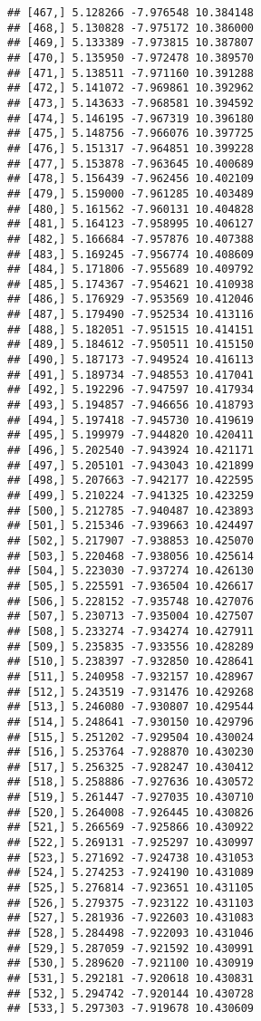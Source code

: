 \documentclass[]{book}
\theoremstyle{definition}
\theoremstyle{definition}
\theoremstyle{definition}
\theoremstyle{remark}
\begin{document}
\begin{verbatim}
## [467,] 5.128266 -7.976548 10.384148
## [468,] 5.130828 -7.975172 10.386000
## [469,] 5.133389 -7.973815 10.387807
## [470,] 5.135950 -7.972478 10.389570
## [471,] 5.138511 -7.971160 10.391288
## [472,] 5.141072 -7.969861 10.392962
## [473,] 5.143633 -7.968581 10.394592
## [474,] 5.146195 -7.967319 10.396180
## [475,] 5.148756 -7.966076 10.397725
## [476,] 5.151317 -7.964851 10.399228
## [477,] 5.153878 -7.963645 10.400689
## [478,] 5.156439 -7.962456 10.402109
## [479,] 5.159000 -7.961285 10.403489
## [480,] 5.161562 -7.960131 10.404828
## [481,] 5.164123 -7.958995 10.406127
## [482,] 5.166684 -7.957876 10.407388
## [483,] 5.169245 -7.956774 10.408609
## [484,] 5.171806 -7.955689 10.409792
## [485,] 5.174367 -7.954621 10.410938
## [486,] 5.176929 -7.953569 10.412046
## [487,] 5.179490 -7.952534 10.413116
## [488,] 5.182051 -7.951515 10.414151
## [489,] 5.184612 -7.950511 10.415150
## [490,] 5.187173 -7.949524 10.416113
## [491,] 5.189734 -7.948553 10.417041
## [492,] 5.192296 -7.947597 10.417934
## [493,] 5.194857 -7.946656 10.418793
## [494,] 5.197418 -7.945730 10.419619
## [495,] 5.199979 -7.944820 10.420411
## [496,] 5.202540 -7.943924 10.421171
## [497,] 5.205101 -7.943043 10.421899
## [498,] 5.207663 -7.942177 10.422595
## [499,] 5.210224 -7.941325 10.423259
## [500,] 5.212785 -7.940487 10.423893
## [501,] 5.215346 -7.939663 10.424497
## [502,] 5.217907 -7.938853 10.425070
## [503,] 5.220468 -7.938056 10.425614
## [504,] 5.223030 -7.937274 10.426130
## [505,] 5.225591 -7.936504 10.426617
## [506,] 5.228152 -7.935748 10.427076
## [507,] 5.230713 -7.935004 10.427507
## [508,] 5.233274 -7.934274 10.427911
## [509,] 5.235835 -7.933556 10.428289
## [510,] 5.238397 -7.932850 10.428641
## [511,] 5.240958 -7.932157 10.428967
## [512,] 5.243519 -7.931476 10.429268
## [513,] 5.246080 -7.930807 10.429544
## [514,] 5.248641 -7.930150 10.429796
## [515,] 5.251202 -7.929504 10.430024
## [516,] 5.253764 -7.928870 10.430230
## [517,] 5.256325 -7.928247 10.430412
## [518,] 5.258886 -7.927636 10.430572
## [519,] 5.261447 -7.927035 10.430710
## [520,] 5.264008 -7.926445 10.430826
## [521,] 5.266569 -7.925866 10.430922
## [522,] 5.269131 -7.925297 10.430997
## [523,] 5.271692 -7.924738 10.431053
## [524,] 5.274253 -7.924190 10.431089
## [525,] 5.276814 -7.923651 10.431105
## [526,] 5.279375 -7.923122 10.431103
## [527,] 5.281936 -7.922603 10.431083
## [528,] 5.284498 -7.922093 10.431046
## [529,] 5.287059 -7.921592 10.430991
## [530,] 5.289620 -7.921100 10.430919
## [531,] 5.292181 -7.920618 10.430831
## [532,] 5.294742 -7.920144 10.430728
## [533,] 5.297303 -7.919678 10.430609

\end{verbatim}
\end{document}
